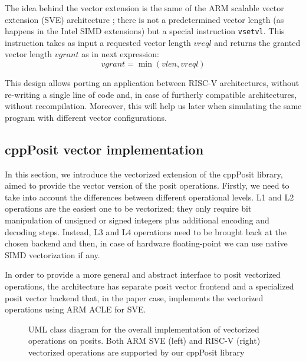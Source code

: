 The idea behind the vector extension is the same of the ARM scalable vector extension (SVE) architecture \cite{armintr}; there is not a predetermined vector length (as happens in the Intel SIMD extensions) but a special instruction \texttt{vsetvl}. This instruction takes as input a requested vector length $vreql$ and returns the granted vector length $vgrant$ as in next expression:
\begin{equation*} %
    vgrant = \min\left(vlen,vreql\right)
\end{equation*}

This design allows porting an application between RISC-V architectures, without re-writing a single line of code and, in case of furtherly compatible architectures, without recompilation. Moreover, this will help us later when simulating the same program with different vector configurations.

\subsection{cppPosit vector implementation}

In this section, we introduce the vectorized extension of the cppPosit library, aimed to provide the vector version of the posit operations. Firstly, we need to take into account the differences between different operational levels. L1 and L2 operations are the easiest one to be vectorized; they only require bit manipulation of unsigned or signed integers plus additional encoding and decoding steps. Instead, L3 and L4 operations need to be brought back at the chosen backend and then, in case of hardware floating-point we can use native SIMD vectorization if any.

In order to provide a more general and abstract interface to posit vectorized operations, the architecture has separate posit vector frontend and a specialized posit vector backend that, in the paper case, implements the vectorized operations using ARM ACLE for SVE.

\begin{figure}
\centering
{}

\caption{UML class diagram for the overall implementation of vectorized operations on posits. Both ARM SVE (left) and RISC-V (right) vectorized operations are supported by our cppPosit library}
\label{fig:cppPositvect}
\end{figure}

